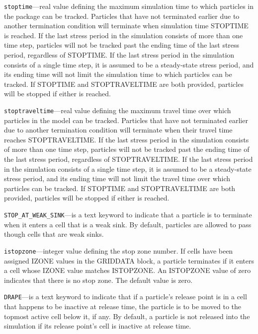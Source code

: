 \begin{description}
\item \texttt{stoptime}---real value defining the maximum simulation time to which particles in the package can be tracked.  Particles that have not terminated earlier due to another termination condition will terminate when simulation time STOPTIME is reached.  If the last stress period in the simulation consists of more than one time step, particles will not be tracked past the ending time of the last stress period, regardless of STOPTIME.  If the last stress period in the simulation consists of a single time step, it is assumed to be a steady-state stress period, and its ending time will not limit the simulation time to which particles can be tracked.  If STOPTIME and STOPTRAVELTIME are both provided, particles will be stopped if either is reached.

\item \texttt{stoptraveltime}---real value defining the maximum travel time over which particles in the model can be tracked.  Particles that have not terminated earlier due to another termination condition will terminate when their travel time reaches STOPTRAVELTIME.  If the last stress period in the simulation consists of more than one time step, particles will not be tracked past the ending time of the last stress period, regardless of STOPTRAVELTIME.  If the last stress period in the simulation consists of a single time step, it is assumed to be a steady-state stress period, and its ending time will not limit the travel time over which particles can be tracked.  If STOPTIME and STOPTRAVELTIME are both provided, particles will be stopped if either is reached.

\item \texttt{STOP\_AT\_WEAK\_SINK}---is a text keyword to indicate that a particle is to terminate when it enters a cell that is a weak sink.  By default, particles are allowed to pass though cells that are weak sinks.

\item \texttt{istopzone}---integer value defining the stop zone number.  If cells have been assigned IZONE values in the GRIDDATA block, a particle terminates if it enters a cell whose IZONE value matches ISTOPZONE.  An ISTOPZONE value of zero indicates that there is no stop zone.  The default value is zero.

\item \texttt{DRAPE}---is a text keyword to indicate that if a particle's release point is in a cell that happens to be inactive at release time, the particle is to be moved to the topmost active cell below it, if any. By default, a particle is not released into the simulation if its release point's cell is inactive at release time.


\end{description}
